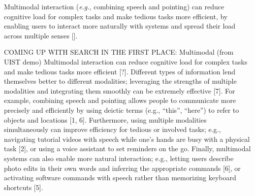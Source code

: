 Multimodal interaction (\textit{e.g.}, combining speech and pointing) can reduce cognitive load for complex tasks and make tedious tasks more efficient, by enabling users to interact more naturally with systems and spread their load across multiple senses []. 

COMING UP WITH SEARCH IN THE FIRST PLACE: Multimodal (from UIST demo)
Multimodal interaction can reduce cognitive load for complex tasks and make tedious tasks more efficient [?]. Different types of information lend themselves better to different modalities; leveraging the strengths of multiple modalities and integrating them smoothly can be extremely effective [7]. For example, combining speech and pointing allows people to communicate more precisely and efficiently by using deictic terms (e.g., “this”, “here”) to refer to objects and locations [1, 6]. Furthermore, using multiple modalities simultaneously can improve efficiency for tedious or involved tasks; e.g., navigating tutorial videos with speech while one’s hands are busy with a physical task [2], or using a voice assistant to set reminders on the go. Finally, multimodal systems can also enable more natural interaction; e.g., letting users describe photo edits in their own words and inferring the appropriate commands [6], or activating software commands with speech rather than memorizing keyboard shortcuts [5].
